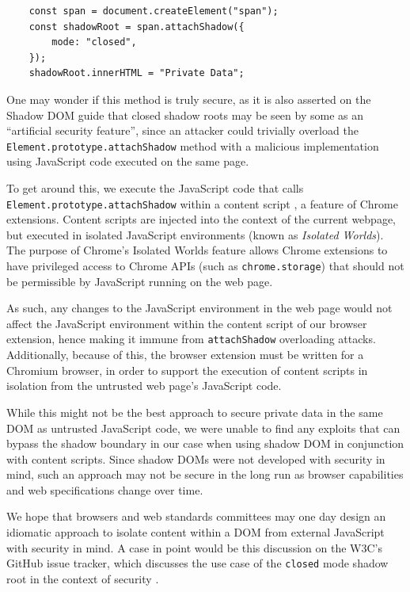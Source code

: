\documentclass[letterpaper,twocolumn,10pt]{article}
\begin{document}
\begin{center}
    \begin{lstlisting}
    const span = document.createElement("span");
    const shadowRoot = span.attachShadow({
        mode: "closed",
    });
    shadowRoot.innerHTML = "Private Data";
    \end{lstlisting}
    \label{fig:shadow_root}
\end{center}

One may wonder if this method is truly secure, as it is also asserted on the Shadow DOM guide \cite{Bidelman} that closed shadow roots may be seen by some as an ``artificial security feature'', since an attacker could trivially overload the \texttt{Element.prototype.attachShadow} method with a malicious implementation using JavaScript code executed on the same page.

To get around this, we execute the JavaScript code that calls \texttt{Element.prototype.attachShadow} within a content script \cite{ContentScript}, a feature of Chrome extensions. Content scripts are injected into the context of the current webpage, but executed in isolated JavaScript environments (known as \textit{Isolated Worlds}). The purpose of Chrome's Isolated Worlds feature allows Chrome extensions to have privileged access to Chrome APIs (such as \texttt{chrome.storage}) that should not be permissible by JavaScript running on the web page.

As such, any changes to the JavaScript environment in the web page would not affect the JavaScript environment within the content script of our browser extension, hence making it immune from \texttt{attachShadow} overloading attacks. Additionally, because of this, the browser extension must be written for a Chromium browser, in order to support the execution of content scripts in isolation from the untrusted web page's JavaScript code.

While this might not be the best approach to secure private data in the same DOM as untrusted JavaScript code, we were unable to find any exploits that can bypass the shadow boundary in our case when using shadow DOM in conjunction with content scripts. Since shadow DOMs were not developed with security in mind, such an approach may not be secure in the long run as browser capabilities and web specifications change over time.

We hope that browsers and web standards committees may one day design an idiomatic approach to isolate content within a DOM from external JavaScript with security in mind. A case in point would be this discussion on the W3C's GitHub issue tracker, which discusses the use case of the \texttt{closed} mode shadow root in the context of security \cite{GitHubW3C}.
\end{document}
